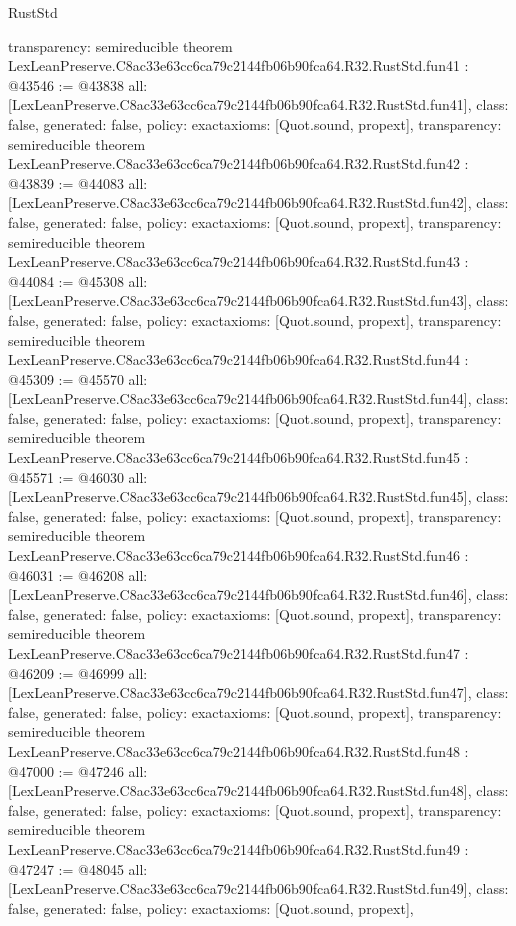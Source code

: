 \begin{lexlean}{RustStd}
\begin{coremodule}
{  transparency: semireducible
}
theorem LexLeanPreserve.C8ac33e63cc6ca79c2144fb06b90fca64.R32.RustStd.fun41 : @43546 := @43838 {
  all: [LexLeanPreserve.C8ac33e63cc6ca79c2144fb06b90fca64.R32.RustStd.fun41],
  class: false,
  generated: false,
  policy: exact{axioms: [Quot.sound, propext]},
  transparency: semireducible
}
theorem LexLeanPreserve.C8ac33e63cc6ca79c2144fb06b90fca64.R32.RustStd.fun42 : @43839 := @44083 {
  all: [LexLeanPreserve.C8ac33e63cc6ca79c2144fb06b90fca64.R32.RustStd.fun42],
  class: false,
  generated: false,
  policy: exact{axioms: [Quot.sound, propext]},
  transparency: semireducible
}
theorem LexLeanPreserve.C8ac33e63cc6ca79c2144fb06b90fca64.R32.RustStd.fun43 : @44084 := @45308 {
  all: [LexLeanPreserve.C8ac33e63cc6ca79c2144fb06b90fca64.R32.RustStd.fun43],
  class: false,
  generated: false,
  policy: exact{axioms: [Quot.sound, propext]},
  transparency: semireducible
}
theorem LexLeanPreserve.C8ac33e63cc6ca79c2144fb06b90fca64.R32.RustStd.fun44 : @45309 := @45570 {
  all: [LexLeanPreserve.C8ac33e63cc6ca79c2144fb06b90fca64.R32.RustStd.fun44],
  class: false,
  generated: false,
  policy: exact{axioms: [Quot.sound, propext]},
  transparency: semireducible
}
theorem LexLeanPreserve.C8ac33e63cc6ca79c2144fb06b90fca64.R32.RustStd.fun45 : @45571 := @46030 {
  all: [LexLeanPreserve.C8ac33e63cc6ca79c2144fb06b90fca64.R32.RustStd.fun45],
  class: false,
  generated: false,
  policy: exact{axioms: [Quot.sound, propext]},
  transparency: semireducible
}
theorem LexLeanPreserve.C8ac33e63cc6ca79c2144fb06b90fca64.R32.RustStd.fun46 : @46031 := @46208 {
  all: [LexLeanPreserve.C8ac33e63cc6ca79c2144fb06b90fca64.R32.RustStd.fun46],
  class: false,
  generated: false,
  policy: exact{axioms: [Quot.sound, propext]},
  transparency: semireducible
}
theorem LexLeanPreserve.C8ac33e63cc6ca79c2144fb06b90fca64.R32.RustStd.fun47 : @46209 := @46999 {
  all: [LexLeanPreserve.C8ac33e63cc6ca79c2144fb06b90fca64.R32.RustStd.fun47],
  class: false,
  generated: false,
  policy: exact{axioms: [Quot.sound, propext]},
  transparency: semireducible
}
theorem LexLeanPreserve.C8ac33e63cc6ca79c2144fb06b90fca64.R32.RustStd.fun48 : @47000 := @47246 {
  all: [LexLeanPreserve.C8ac33e63cc6ca79c2144fb06b90fca64.R32.RustStd.fun48],
  class: false,
  generated: false,
  policy: exact{axioms: [Quot.sound, propext]},
  transparency: semireducible
}
theorem LexLeanPreserve.C8ac33e63cc6ca79c2144fb06b90fca64.R32.RustStd.fun49 : @47247 := @48045 {
  all: [LexLeanPreserve.C8ac33e63cc6ca79c2144fb06b90fca64.R32.RustStd.fun49],
  class: false,
  generated: false,
  policy: exact{axioms: [Quot.sound, propext]},
}
\end{coremodule}
\end{lexlean}
